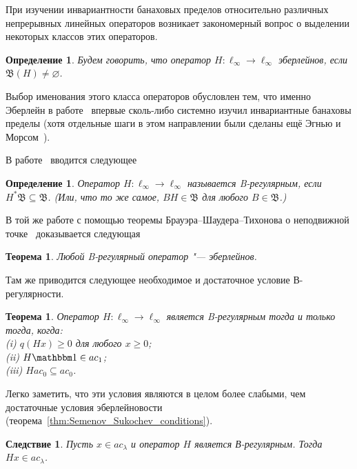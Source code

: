 \documentclass[a4paper,14pt]{article} %
\newcommand{\B}{\ensuremath{\mathfrak{B}}}
\newcommand{\one}{\ensuremath{\mathbbm 1}}
\theoremstyle{plain}
\newtheorem{theorem}[lemma]{Теорема}
\newtheorem{corollary}{Следствие}[lemma]
\newtheorem{definition}[lemma]{Определение}
\begin{document}
При изучении инвариантности банаховых пределов относительно различных непрерывных линейных операторов
возникает закономерный вопрос о выделении некоторых классов этих операторов.

\begin{definition}
	Будем говорить, что оператор $H : \ell_\infty \to \ell_\infty$ \emph{эберлейнов},
	если $\B (H) \ne \varnothing$.
\end{definition}

Выбор именования этого класса операторов обусловлен тем, что именно Эберлейн в работе~\cite{Eberlein}
впервые сколь-либо системно изучил инвариантные банаховы пределы
(хотя отдельные шаги в этом направлении были сделаны ещё Эгнью и Морсом~\cite{agnew1938linear,agnew1938extensions}).

В работе~\cite{alekhno2018invariant} вводится следующее

\begin{definition}
	\label{def:B-regular_operator}
	Оператор $H : \ell_\infty \to \ell_\infty$ называется \emph{B-регулярным},
	если $H^*\B \subseteq \B$.
	(Или, что то же самое, $BH\in\B$ для любого $B\in\B$.)
\end{definition}

В той же работе с помощью теоремы Брауэра--Шаудера--Тихонова о неподвижной точке~\cite[Corollary  17.56]{aliprantis2006infinite}
доказывается следующая
\begin{theorem}
	\label{thm:B-regular_is_Eberlein}
	Любой B-регулярный оператор "--- эберлейнов.
\end{theorem}


Там же приводится следующее необходимое и достаточное условие В-регулярности.

\begin{theorem}
	\label{thm:crit_B_regularity}
	Оператор $H:\ell_\infty \to \ell_\infty$ является B-регулярным тогда и только тогда, когда:
	\\(i) $q(Hx)\geq 0$ для любого $x\geq 0$;
	\\(ii) $H\one \in ac_1$;
	\\(iii) $H ac_0 \subseteq ac_0$.
\end{theorem}
Легко заметить, что эти условия являются в целом более слабыми, чем достаточные условия эберлейновости
(теорема~\ref{thm:Semenov_Sukochev_conditions}).

\begin{corollary}
	Пусть $x\in ac_\lambda$ и оператор $H$ является В-регулярным.
	Тогда $Hx \in ac_\lambda$.
\end{corollary}
\end{document}
